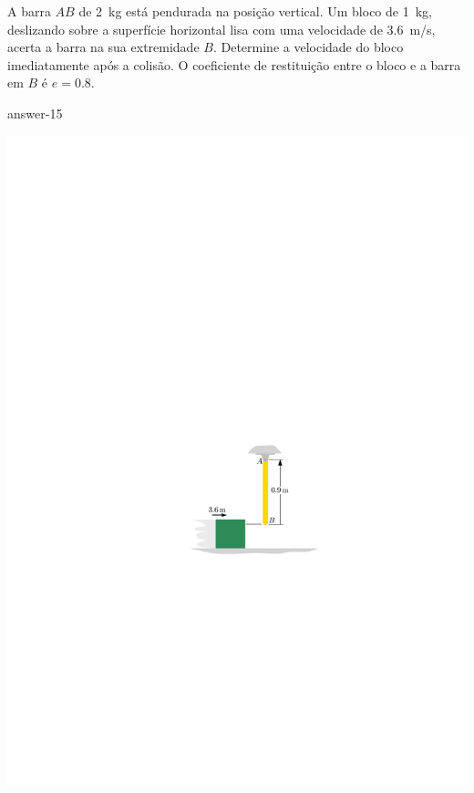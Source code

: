 \item A barra $AB$ de \SI{2}{\kilogram} está pendurada na posição vertical. Um bloco de \SI{1}{\kilogram}, deslizando sobre a superfície horizontal lisa com uma velocidade de \SI{3.6}{\meter/\second}, acerta a barra na sua extremidade $B$. Determine a velocidade do bloco imediatamente após a colisão. O coeficiente de restituição entre o bloco e a barra em $B$ é $e=0.8$.

{answer-15}

\vspace{-1.1cm}
\begin{flushright}
	\includegraphics[scale=1.25]{../../images/draw_13}
\end{flushright}